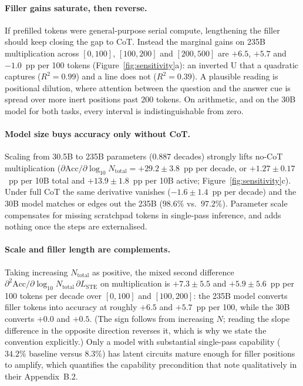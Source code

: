 \documentclass[11pt,a4paper]{article}
\begin{document}
\paragraph{Filler gains saturate, then reverse.}
If prefilled tokens were general-purpose serial compute, lengthening the filler
should keep closing the gap to CoT. Instead the marginal gains on 235B
multiplication across $[0,100]$, $[100,200]$ and $[200,500]$ are $+6.5$, $+5.7$
and $-1.0$~pp per 100 tokens (Figure~\ref{fig:sensitivity}a): an inverted U that a
quadratic captures ($R^2=0.99$) and a line does not ($R^2=0.39$). A plausible
reading is positional dilution, where attention between the question and the
answer cue is spread over more inert positions past 200 tokens. On arithmetic, and
on the 30B model for both tasks, every interval is indistinguishable from zero.

\paragraph{Model size buys accuracy only without CoT.}
Scaling from 30.5B to 235B parameters (0.887 decades) strongly lifts no-CoT
multiplication ($\partial\mathrm{Acc}/\partial\log_{10}N_{\mathrm{total}}
=+29.2\pm3.8$~pp per decade, or $+1.27\pm0.17$~pp per 10B total and
$+13.9\pm1.8$~pp per 10B active; Figure~\ref{fig:sensitivity}c). Under full CoT
the same derivative vanishes ($-1.6\pm1.4$~pp per decade) and the 30B model
matches or edges out the 235B ($98.6\%$ vs.\ $97.2\%$). Parameter scale
compensates for missing scratchpad tokens in single-pass inference, and adds
nothing once the steps are externalised.

\paragraph{Scale and filler length are complements.}
Taking increasing $N_{\mathrm{total}}$ as positive, the mixed second difference
$\partial^2\mathrm{Acc}/\partial\log_{10}N_{\mathrm{total}}\,\partial L_{\mathrm{STE}}$
on multiplication is $+7.3\pm5.5$ and $+5.9\pm5.6$~pp per 100 tokens per decade
over $[0,100]$ and $[100,200]$: the 235B model converts filler tokens into
accuracy at roughly $+6.5$ and $+5.7$~pp per 100, while the 30B converts
$+0.0$ and $+0.5$. (The sign follows from increasing $N$; reading the slope
difference in the opposite direction reverses it, which is why we state the
convention explicitly.) Only a model with substantial single-pass capability
($34.2\%$ baseline versus $8.3\%$) has latent circuits mature enough for filler
positions to amplify, which quantifies the capability precondition that
\citet{baherwani2026not} note qualitatively in their Appendix~B.2.
\end{document}
